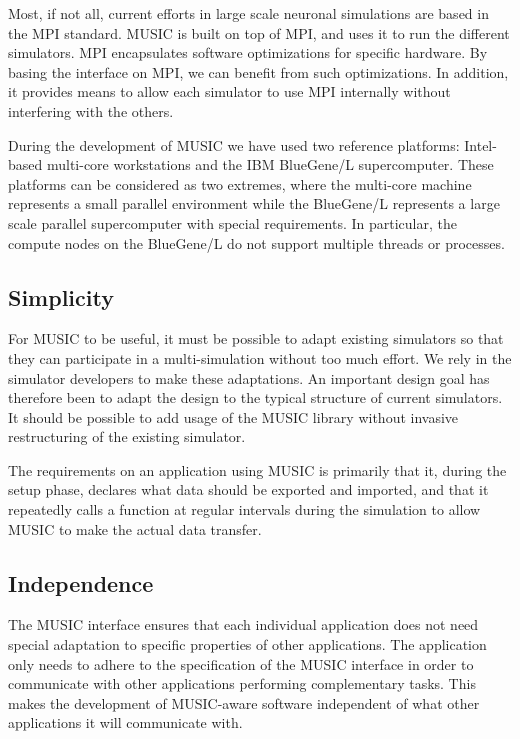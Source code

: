 \documentclass[a4paper]{report}
\begin{document}
Most, if not all, current efforts in large scale neuronal simulations
are based in the MPI standard.  MUSIC is built on top of
MPI, and uses it to run the different simulators.  MPI encapsulates
software optimizations for specific hardware.  By basing the interface
on MPI, we can benefit from such optimizations.  In addition, it
provides means to allow each simulator to use MPI internally without
interfering with the others.

During the development of MUSIC we have used two reference platforms:
Intel-based multi-core workstations and the IBM
BlueGene/L supercomputer.  These
platforms can be considered as two extremes, where the multi-core
machine represents a small parallel environment while the BlueGene/L
represents a large scale parallel supercomputer with special
requirements.  In particular, the compute nodes on the BlueGene/L do
not support multiple threads or processes.


\subsection{Simplicity}

For MUSIC to be useful, it must be possible to adapt existing
simulators so that they can participate in a multi-simulation without
too much effort.  We rely in the simulator developers to make these
adaptations.  An important design goal has therefore been to adapt the
design to the typical structure of current simulators.  It should be
possible to add usage of the MUSIC library without invasive
restructuring of the existing simulator.

The requirements on an application using MUSIC is primarily that it,
during the setup phase, declares what data should be exported and
imported, and that it repeatedly calls a function at regular intervals
during the simulation to allow MUSIC to make the actual data transfer.


\subsection{Independence}

The MUSIC interface ensures that each individual application does not
need special adaptation to specific properties of other applications.
The application only needs to adhere to the specification of the MUSIC
interface in order to communicate with other applications performing
complementary tasks.  This makes the development of MUSIC-aware
software independent of what other applications it will communicate
with.
\end{document}
